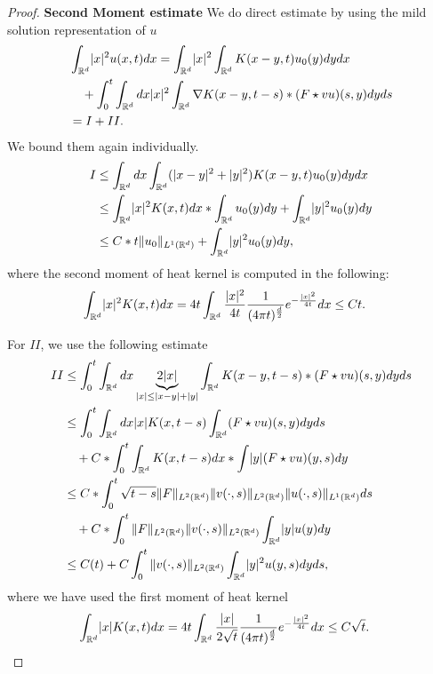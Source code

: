 \begin{proof}
{\bf Second Moment estimate}
   We do direct estimate by using the mild solution representation of $u$
   \begin{align*}
   &     \int_{\mathbb{R}^{d} } \lvert x\rvert^2 u(x,t) dx = \int_{\mathbb{R}^{d} } \lvert x\rvert^2   \int_{\mathbb{R}^{d} } K(x-y,t) u_{0}(y) dy dx\\
   &\quad +  \int_0^{t} \int_{\mathbb{R}^{d} } dx \lvert x\rvert^2  \int_{\mathbb{R}^{d} } \nabla K(x-y,t-s) *(F \star  v  u)(s,y) dy ds \\
   &= I + II
   .\end{align*} 
   We bound them again individually.
   \begin{align*}
   I &\le \int_{\mathbb{R}^{d} } dx \int_{\mathbb{R}^{d} } (\lvert x-y\rvert^2+\lvert y\rvert^2) K(x-y,t)  u_{0} (y) dy dx\\
   &\le \int_{\mathbb{R}^{d} } \lvert x\rvert^2K(x,t) dx * \int_{\mathbb{R}^d} u_{0} (y) dy  +  \int_{\mathbb{R}^{d} }  \lvert y\rvert^2 u_0(y) dy\\
   &\le  C*t   \|u_0\|_{L^{1}(\mathbb{R}^d) } + \int_{\mathbb{R}^d} \lvert y\rvert^2 u_0(y) dy
   ,\end{align*}
   where the second moment of heat kernel is computed in the following: 
   \begin{align*}
   \int_{\mathbb{R}^d} \lvert x\rvert^2 K(x,t) dx &=  4t\int_{\mathbb{R}^d} \frac{\lvert x\rvert^2}{4t} \frac{1}{(4\pi t)^{\frac{d}{2}} } e^{-\frac{\lvert x\rvert^2}{4t}}  dx\leq  Ct 
   .\end{align*}
     
   For $II$, we use the following estimate
   \begin{align*}
   II &\leq \int_0^{t} \int_{\mathbb{R}^{d} }  dx \underbrace{2|x|}_{\lvert x\rvert \le \lvert x-y\rvert + \lvert y\rvert} \int_{\mathbb{R}^{d} } K(x-y,t-s)  *(F \star  v  u)(s,y)  dy ds\\
   &\leq \int_0^{t} \int_{\mathbb{R}^{d} }  dx |x| K(x,t-s) \int_{\mathbb{R}^{d} } (F \star  vu)(s,y)  dy ds\\
   &\quad + C * \int_0^{t}  \int_{\mathbb{R}^{d} }K(x,t-s) dx * \int \lvert y\rvert (F \star  vu)(y,s) dy\\
   &\le C*\int_0^{t} \sqrt{t-s} \|F\|_{L^2(\mathbb{R}^d)} \| v (\cdot,s)\|_{L^{2}(\mathbb{R}^d) } \| u (\cdot,s)\|_{L^{1}(\mathbb{R}^d) }   ds \\
   &\quad  + C * \int_0^{t}  \|F\|_{L^2(\mathbb{R}^d)} \| v (\cdot,s)\|_{L^{2}(\mathbb{R}^d) } \int_{\mathbb{R}^{d} } \lvert y\rvert  u (y) dy\\
   &\le C(t) + C \int_0^{t}  \| v (\cdot,s)\|_{L^{2}(\mathbb{R}^d) } \int_{\mathbb{R}^{d} } \lvert y\rvert^2 u (y,s) dy ds
   ,\end{align*}
   where we have used the first moment of heat kernel
   \begin{align*}
   \int_{\mathbb{R}^d} \lvert x\rvert K(x,t) dx &=  4t\int_{\mathbb{R}^d} \frac{\lvert x\rvert}{2\sqrt{t}} \frac{1}{(4\pi t)^{\frac{d}{2}} } e^{-\frac{\lvert x\rvert^2}{4t}}  dx\leq  C\sqrt{t}.
   \end{align*}
   

\end{proof}
